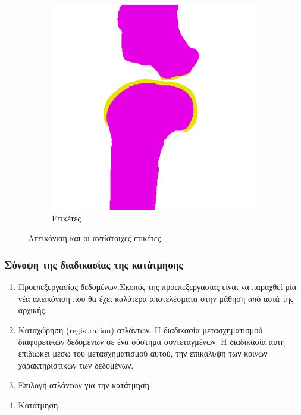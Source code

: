 \documentclass{beamer}
\begin{document}
\begin{frame}
\begin{figure}[H]
\begin{subfigure}[t]{0.22\linewidth}
    \includegraphics[width=\linewidth]{original_label_registration_1.png}
    \caption{Ετικέτες}
    \end{subfigure}

    \caption{Απεικόνιση και οι αντίστοιχες ετικέτες.}
    \label{fig:image_labels:1}
\end{figure}

\end{frame}


\begin{frame}
\frametitle{Σύνοψη της διαδικασίας της κατάτμησης}
\begin{enumerate}
    \item<1-> Προεπεξεργασίας δεδομένων.Σκοπός της προεπεξεργασίας είναι να
        παραχθεί μία νέα απεικόνιση που θα έχει καλύτερα αποτελέσματα στην
        μάθηση από αυτά της αρχικής.
    \item<2-> Καταχώρηση (registration) ατλάντων. Η διαδικασία μετασχηματισμού
        διαφορετικών δεδομένων σε ένα σύστημα συντεταγμένων. Η διαδικασία αυτή
        επιδιώκει μέσω του μετασχηματισμού αυτού, την επικάλυψη των κοινών
        χαρακτηριστικών των δεδομένων.
    \item<3-> Επιλογή ατλάντων για την κατάτμηση.
    \item<4-> Κατάτμηση.
\end{enumerate}
\end{frame}
\end{document}
